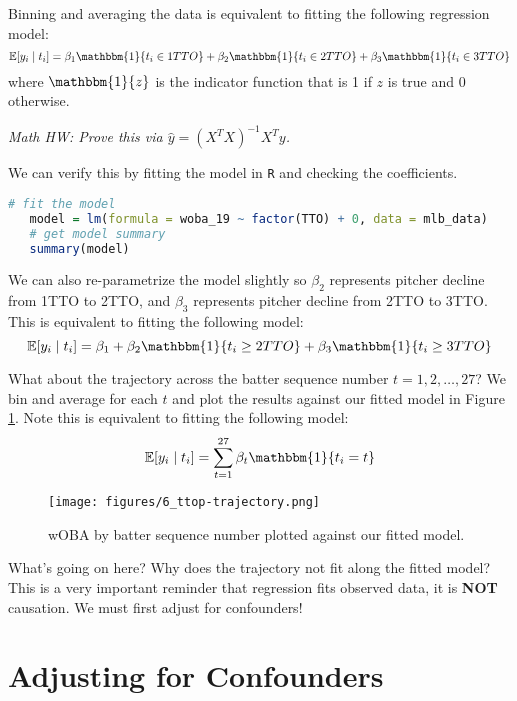 \documentclass[twoside]{article}
\theoremstyle{definition}
\begin{document}
Binning and averaging the data is equivalent to fitting the following regression model:
\begin{equation}
   \mathbb{E}[y_i \mid t_i] = \beta_1 \mathbbm{1}\{t_i \in 1TTO\} + \beta_2 \mathbbm{1}\{t_i \in 2TTO\} + \beta_3 \mathbbm{1}\{t_i \in 3TTO\}
\end{equation}
where $\mathbbm{1}\{z\}$ is the indicator function that is 1 if $z$ is true and 0 otherwise.

\color{blue}
\textit{Math HW: Prove this via $\widehat y = (X^T X)^{-1} X^T y$.}
\color{black}

We can verify this by fitting the model in \texttt{R} and checking the coefficients.
\begin{lstlisting}[language=R]
   # fit the model
   model = lm(formula = woba_19 ~ factor(TTO) + 0, data = mlb_data)
   # get model summary
   summary(model)
\end{lstlisting}
We can also re-parametrize the model slightly so $\beta_2$ represents pitcher decline from 1TTO to 2TTO, and $\beta_3$ represents pitcher decline from 2TTO to 3TTO. This is equivalent to fitting the following model:
\begin{equation}
   \mathbb{E}[y_i \mid t_i] = \beta_1 + \beta_2 \mathbbm{1}\{t_i \geq 2TTO\} + \beta_3 \mathbbm{1}\{t_i \geq 3TTO\}
\end{equation}

What about the \color{blue} trajectory \color{black} across the batter sequence number $t = 1,2, \hdots, 27$? We bin and average for each $t$ and plot the results against our fitted model in Figure \ref{fig:ttop-trajectory}. Note this is equivalent to fitting the following model:
\begin{equation}
   \mathbb{E}[y_i \mid t_i] = \sum_{t = 1}^{27} \beta_t \mathbbm{1}\{t_i = t\}
\end{equation}
\begin{figure}[H]
   \centering
   \texttt{[image: figures/6\_ttop-trajectory.png]}
   \caption{wOBA by batter sequence number plotted against our fitted model.}
   \label{fig:ttop-trajectory}
\end{figure}
What's going on here? Why does the trajectory not fit along the fitted model? This is a very important reminder that regression fits observed data, it is \textbf{NOT} causation. We must first \color{red} adjust for confounders! \color{black}

\section{Adjusting for Confounders}
\end{document}

